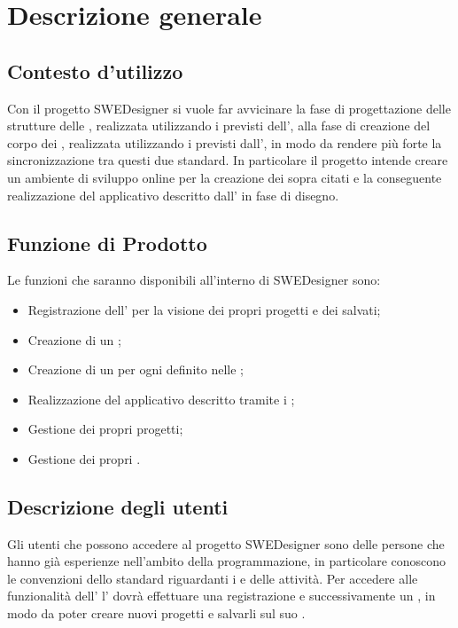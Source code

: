 \section{Descrizione generale}
\subsection{Contesto d'utilizzo}
Con il progetto SWEDesigner si vuole far avvicinare la fase di progettazione delle strutture delle , realizzata utilizzando i  previsti dell', alla fase di creazione del corpo dei , realizzata utilizzando i  previsti dall', in modo da  rendere più forte la sincronizzazione tra questi due standard. In particolare il progetto intende creare un ambiente di sviluppo online per la creazione dei  sopra citati e la conseguente realizzazione del  applicativo descritto dall' in fase di disegno.

\subsection{Funzione di Prodotto}
Le funzioni che saranno disponibili all'interno di SWEDesigner sono:
\begin{itemize}
\item Registrazione dell' per la visione dei propri progetti e dei  salvati;
\item Creazione di un ;
\item Creazione di un  per ogni  definito nelle ;
\item Realizzazione del  applicativo descritto tramite i ;
\item Gestione dei propri progetti;
\item Gestione dei propri .
\end{itemize}

\subsection{Descrizione degli utenti}
Gli utenti che possono accedere al progetto SWEDesigner sono delle persone che hanno già esperienze nell'ambito della programmazione, in particolare conoscono le convenzioni dello standard  riguardanti i  e delle attività. 
Per accedere alle funzionalità dell' l' dovrà effettuare una registrazione e successivamente un , in modo da poter creare nuovi progetti e salvarli sul suo .

